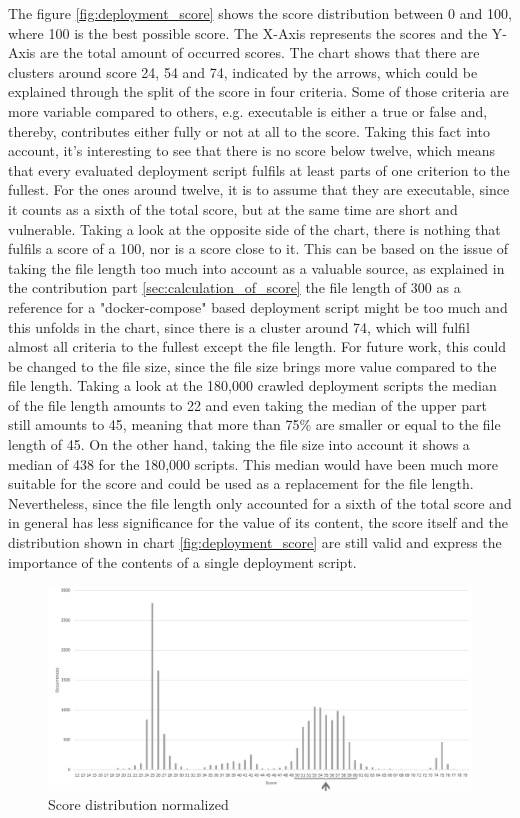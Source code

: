The figure \ref{fig:deployment_score} shows the score distribution between 0 and 100, where 100 is the best possible score. The X-Axis represents the scores and the Y-Axis are the total amount of occurred scores. The chart shows that there are clusters around score 24, 54 and 74, indicated by the arrows, which could be explained through the split of the score in four criteria. Some of those criteria are more variable compared to others, e.g. executable is either a true or false and, thereby, contributes either fully or not at all to the score. Taking this fact into account, it's interesting to see that there is no score below twelve, which means that every evaluated deployment script fulfils at least parts of one criterion to the fullest. For the ones around twelve, it is to assume that they are executable, since it counts as a sixth of the total score, but at the same time are short and vulnerable. Taking a look at the opposite side of the chart, there is nothing that fulfils a score of a 100, nor is a score close to it. This can be based on the issue of taking the file length too much into account as a valuable source, as explained in the contribution part \ref{sec:calculation_of_score} the file length of 300 as a reference for a "docker-compose" based deployment script might be too much and this unfolds in the chart, since there is a cluster around 74, which will fulfil almost all criteria to the fullest except the file length. For future work, this could be changed to the file size, since the file size brings more value compared to the file length. Taking a look at the 180,000 crawled deployment scripts the median of the file length amounts to 22 and even taking the median of the upper part still amounts to 45, meaning that more than 75\% are smaller or equal to the file length of 45. On the other hand, taking the file size into account it shows a median of 438 for the 180,000 scripts. This median would have been much more suitable for the score and could be used as a replacement for the file length. Nevertheless, since the file length only accounted for a sixth of the total score and in general has less significance for the value of its content, the score itself and the distribution shown in chart \ref{fig:deployment_score} are still valid and express the importance of the contents of a single deployment script.

\begin{figure}[H]
    \centering
    \includegraphics[scale=0.4]{graphics/deployment_score_normalized_bw.png}
    \caption{Score distribution normalized}
    \label{fig:deployment_score_normalized}
\end{figure}

